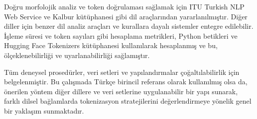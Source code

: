 Doğru morfolojik analiz ve token doğrulaması sağlamak için ITU Turkish NLP Web Service \cite{eryigit_itu_2014} ve Kalbur kütüphanesi \cite{aksoy_ahmetaxkalbur_2024} gibi dil araçlarından yararlanılmıştır. Diğer diller için benzer dil analiz araçları ve kurallara dayalı sistemler entegre edilebilir. İşleme süresi ve token sayıları gibi hesaplama metrikleri, Python betikleri ve Hugging Face Tokenizers kütüphanesi \cite{neubeck_so_2024} kullanılarak hesaplanmış ve bu, ölçeklenebilirliği ve uyarlanabilirliği sağlamıştır.

Tüm deneysel prosedürler, veri setleri ve yapılandırmalar çoğaltılabilirlik için belgelenmiştir. Bu çalışmada Türkçe birincil referans olarak kullanılmış olsa da, önerilen yöntem diğer dillere ve veri setlerine uygulanabilir bir yapı sunarak, farklı dilsel bağlamlarda tokenizasyon stratejilerini değerlendirmeye yönelik genel bir yaklaşım sunmaktadır.